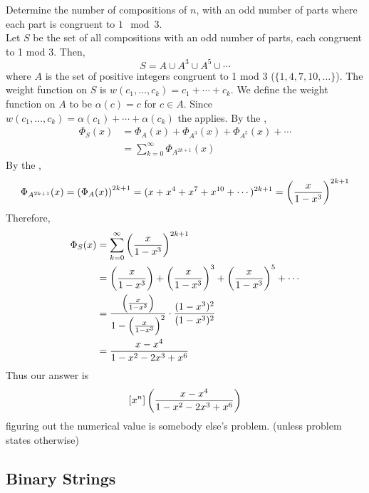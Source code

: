 \documentclass[english, 11pt]{article}
\begin{document}
   \begin{exmp}
     Determine the number of compositions of $n$, with an odd number of parts where each part is congruent to $1\mod 3$. \\

     Let $S$ be the set of all compositions with an odd number of parts, each congruent to 1 mod 3. Then,
     \[ S = A \cup A^3 \cup A^5 \cup \cdots \]
     where $A$ is the set of positive integers congruent to 1 mod 3 ($\{ 1,4,7,10,\ldots\}$). The weight function on $S$ is $w(c_1, \ldots, c_k) = c_1 + \cdots + c_k$. We define the weight function on $A$ to be $\alpha(c) = c$ for $c \in A$. Since $w(c_1, \ldots, c_k) = \alpha(c_1) + \cdots + \alpha(c_k)$ the  applies. By the ,
     \begin{align*}
       \Phi_S(x) & = \Phi_A(x) + \Phi_{A^3}(x) + \Phi_{A^5}(x) + \cdots \\
       & = \sum_{k = 0}^{\infty} \Phi_{A^{2k + 1}}(x)
     \end{align*}
     By the ,
     \[ \Phi_{A^{2k+1}}(x) = \left( \Phi_A(x) \right)^{2k +1} = (x + x^4 + x^7 + x^{10} + \cdots)^{2k +1} = \left( \frac{x}{1-x^3} \right)^{2k+1} \]
     Therefore,
     \begin{align*}
       \Phi_S(x) & = \sum_{k=0}^{\infty} \left( \frac{x}{1-x^3} \right)^{2k+1} \\
       & = \left( \frac{x}{1-x^3} \right) +  \left( \frac{x}{1-x^3} \right)^3 + \left( \frac{x}{1-x^3} \right)^5 + \cdots \\
       & = \frac{\left( \frac{x}{1-x^3} \right)}{1- \left( \frac{x}{1-x^3} \right)^2} \cdot \frac{(1-x^3)^2}{(1-x^3)^2} \\ & = \frac{x-x^4}{1-x^2 - 2x^3 + x^6}
     \end{align*}
     Thus our answer is
     \[ [x^n]\left( \frac{x-x^4}{1-x^2 - 2x^3 + x^6} \right) \]
     figuring out the numerical value is somebody else's problem. (unless problem states otherwise)
   \end{exmp}

   \subsection{Binary Strings}
\end{document}
